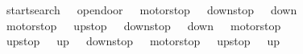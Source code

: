 \begin{isabellebody}
\ \ \ \ \ \ {\isacharparenleft}{\isacharparenleft}{}{\isacharcomma}\ {}{\isacharparenright}{\isacharcomma}\ startsearch{\isacharparenright}{\isacharcomma}\ {\isacharparenleft}{\isacharparenleft}{}{\isacharcomma}\ {}{\isacharparenright}{\isacharcomma}\ opendoor{}{\isacharparenright}{\isacharcomma}\ {\isacharparenleft}{\isacharparenleft}{}{\isacharcomma}\ {}{\isacharparenright}{\isacharcomma}\ motorstop{}{\isacharparenright}{\isacharcomma}\ {\isacharparenleft}{\isacharparenleft}{}{\isacharcomma}\ {}{\isacharparenright}{\isacharcomma}\ down{}{}stop{\isacharparenright}{\isacharcomma}\ {\isacharparenleft}{\isacharparenleft}{}{\isacharcomma}\ {}{\isacharparenright}{\isacharcomma}\ down{}{}{\isacharparenright}{\isacharcomma}\isanewline
\ \ \ \ \ \ {\isacharparenleft}{\isacharparenleft}{}{\isacharcomma}\ {}{\isacharparenright}{\isacharcomma}\ motorstop{}{\isacharparenright}{\isacharcomma}\ {\isacharparenleft}{\isacharparenleft}{}{\isacharcomma}\ {}{\isacharparenright}{\isacharcomma}\ up{}{}stop{\isacharparenright}{\isacharcomma}\ {\isacharparenleft}{\isacharparenleft}{}{\isacharcomma}\ {}{\isacharparenright}{\isacharcomma}\ down{}{}stop{\isacharparenright}{\isacharcomma}\ {\isacharparenleft}{\isacharparenleft}{}{\isacharcomma}\ {}{\isacharparenright}{\isacharcomma}\ down{}{}{\isacharparenright}{\isacharcomma}\ {\isacharparenleft}{\isacharparenleft}{}{\isacharcomma}\ {}{\isacharparenright}{\isacharcomma}\ motorstop{}{\isacharparenright}{\isacharcomma}\isanewline
\ \ \ \ \ \ {\isacharparenleft}{\isacharparenleft}{}{\isacharcomma}\ {}{\isacharparenright}{\isacharcomma}\ up{}{}stop{\isacharparenright}{\isacharcomma}\ {\isacharparenleft}{\isacharparenleft}{}{\isacharcomma}\ {}{\isacharparenright}{\isacharcomma}\ up{}{}{\isacharparenright}{\isacharcomma}\ {\isacharparenleft}{\isacharparenleft}{}{\isacharcomma}\ {}{\isacharparenright}{\isacharcomma}\ down{}{}stop{\isacharparenright}{\isacharcomma}\ {\isacharparenleft}{\isacharparenleft}{}{\isacharcomma}\ {}{\isacharparenright}{\isacharcomma}\ motorstop{}{\isacharparenright}{\isacharcomma}\ {\isacharparenleft}{\isacharparenleft}{}{\isacharcomma}\ {}{\isacharparenright}{\isacharcomma}\ up{}{}stop{\isacharparenright}{\isacharcomma}\ {\isacharparenleft}{\isacharparenleft}{}{\isacharcomma}\ {}{\isacharparenright}{\isacharcomma}\ up{}{}{\isacharparenright}{\isacharbar}{\isacharbraceright}{\isachardoublequoteclose}\isanewline

\end{isabellebody}
